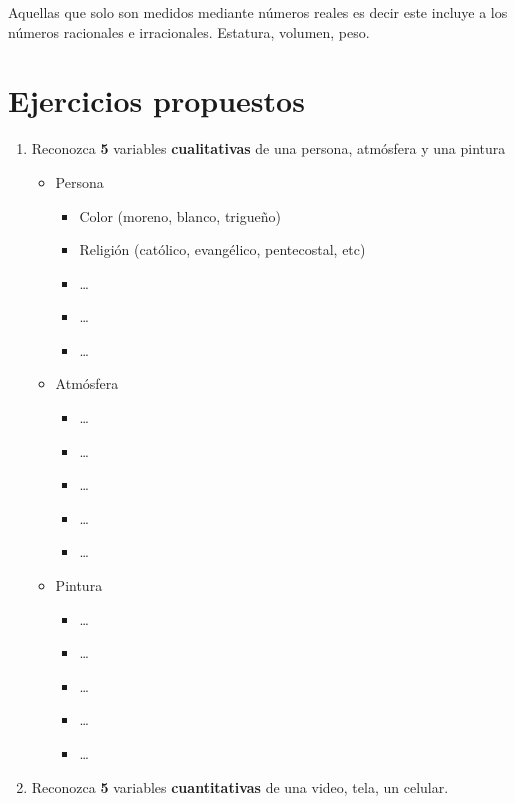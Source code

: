 \documentclass[10pt,]{krantz}
\providecommand{\tightlist}{%
  \setlength{\itemsep}{0pt}\setlength{\parskip}{0pt}}
\theoremstyle{definition}
\theoremstyle{definition}
\theoremstyle{definition}
\theoremstyle{definition}
\theoremstyle{remark}
\begin{document}
Aquellas que solo son medidos mediante números reales es decir este incluye a los números racionales e irracionales. Estatura, volumen, peso.

\hypertarget{ejercicios-propuestos}{%
\section{Ejercicios propuestos}\label{ejercicios-propuestos}}

\begin{enumerate}
\def\labelenumi{\arabic{enumi}.}
\item
  Reconozca \textbf{5} variables \textbf{cualitativas} de una persona, atmósfera y una pintura

  \begin{itemize}
  \item
    Persona

    \begin{itemize}
    \tightlist
    \item
      Color (moreno, blanco, trigueño)
    \item
      Religión (católico, evangélico, pentecostal, etc)
    \item
      \ldots{}
    \item
      \ldots{}
    \item
      \ldots{}
    \end{itemize}
  \item
    Atmósfera

    \begin{itemize}
    \tightlist
    \item
      \ldots{}
    \item
      \ldots{}
    \item
      \ldots{}
    \item
      \ldots{}
    \item
      \ldots{}
    \end{itemize}
  \item
    Pintura

    \begin{itemize}
    \tightlist
    \item
      \ldots{}
    \item
      \ldots{}
    \item
      \ldots{}
    \item
      \ldots{}
    \item
      \ldots{}
    \end{itemize}
  \end{itemize}
\item
  Reconozca \textbf{5} variables \textbf{cuantitativas} de una video, tela, un celular.


\end{enumerate}
\end{document}
